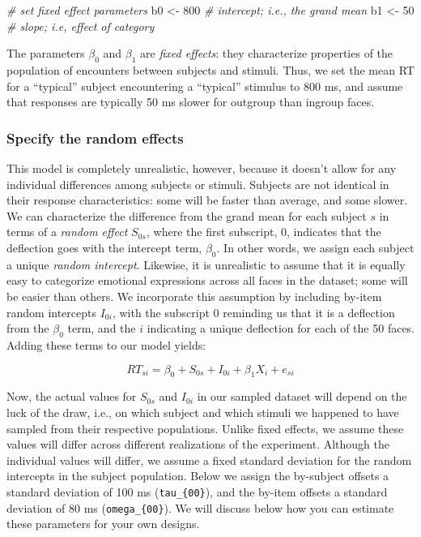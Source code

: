 \documentclass[doc,floatsintext]{apa6}
\newenvironment{Shaded}{\begin{snugshade}}{\end{snugshade}}
\newcommand{\DecValTok}[1]{\textcolor[rgb]{0.00,0.00,0.81}{#1}}
\newcommand{\StringTok}[1]{\textcolor[rgb]{0.31,0.60,0.02}{#1}}
\newcommand{\CommentTok}[1]{\textcolor[rgb]{0.56,0.35,0.01}{\textit{#1}}}
\newcommand{\NormalTok}[1]{#1}
\begin{document}
\begin{Shaded}
\begin{Highlighting}[]
\CommentTok{# set fixed effect parameters}
\NormalTok{b0 <-}\StringTok{ }\DecValTok{800} \CommentTok{# intercept; i.e., the grand mean}
\NormalTok{b1 <-}\StringTok{  }\DecValTok{50} \CommentTok{# slope; i.e, effect of category}
\end{Highlighting}
\end{Shaded}

\noindent The parameters \(\beta_0\) and \(\beta_1\) are \emph{fixed
effects}: they characterize properties of the population of encounters
between subjects and stimuli. Thus, we set the mean RT for a
\enquote{typical} subject encountering a \enquote{typical} stimulus to
800 ms, and assume that responses are typically 50 ms slower for
outgroup than ingroup faces.

\subsubsection{Specify the random
effects}\label{specify-the-random-effects}

This model is completely unrealistic, however, because it doesn't allow
for any individual differences among subjects or stimuli. Subjects are
not identical in their response characteristics: some will be faster
than average, and some slower. We can characterize the difference from
the grand mean for each subject \(s\) in terms of a \emph{random effect}
\(S_{0s}\), where the first subscript, 0, indicates that the deflection
goes with the intercept term, \(\beta_0\). In other words, we assign
each subject a unique \emph{random intercept}. Likewise, it is
unrealistic to assume that it is equally easy to categorize emotional
expressions across all faces in the dataset; some will be easier than
others. We incorporate this assumption by including by-item random
intercepts \(I_{0i}\), with the subscript 0 reminding us that it is a
deflection from the \(\beta_0\) term, and the \(i\) indicating a unique
deflection for each of the 50 faces. Adding these terms to our model
yields:

\begin{equation}
RT_{si} = \beta_0 + S_{0s} + I_{0i} + \beta_1 X_i + e_{si}
\end{equation}

Now, the actual values for \(S_{0s}\) and \(I_{0i}\) in our sampled
dataset will depend on the luck of the draw, i.e., on which subject and
which stimuli we happened to have sampled from their respective
populations. Unlike fixed effects, we assume these values will differ
across different realizations of the experiment. Although the individual
values will differ, we assume a fixed standard deviation for the random
intercepts in the subject population. Below we assign the by-subject
offsets a standard deviation of 100 ms (\texttt{tau\_\{00\}}), and the
by-item offsets a standard deviation of 80 ms (\texttt{omega\_\{00\}}).
We will discuss below how you can estimate these parameters for your own
designs.
\end{document}
